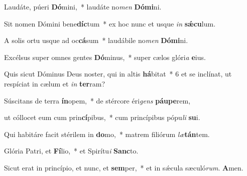 \item Laudáte, púeri \textbf{Dó}mini,~* laudáte no\textit{men} \textbf{Dómi}ni.

\item Sit nomen Dómini bene\textbf{díc}tum~* ex hoc nunc et usque \textit{in} \textbf{sǽcu}lum.

\item A solis ortu usque ad oc\textbf{cá}sum~* laudábile no\textit{men} \textbf{Dómi}ni.

\item Excélsus super omnes gentes \textbf{Dó}minus,~* super cælos glóri\textit{a} \textbf{e}ius.

\item Quis sicut Dóminus Deus noster, qui in altis \textbf{há}bitat~* 6 et se inclínat, ut respíciat in cælum et \textit{in} \textbf{ter}ram?

\item Súscitans de terra \textbf{ín}opem,~* de stércore éri\textit{gens} \textbf{páupe}rem,

\item ut cóllocet eum cum prin\textbf{cí}pibus,~* cum princípibus pópu\textit{li} \textbf{su}i.

\item Qui habitáre facit stérilem in \textbf{do}mo,~* matrem filiórum \textit{læ}\textbf{tán}tem.

\item Glória Patri, et \textbf{Fí}lio,~* et Spirítu\textit{i} \textbf{Sanc}to.

\item Sicut erat in princípio, et nunc, et \textbf{sem}per,~* et in sǽcula sæculó\textit{rum}. \textbf{A}men.